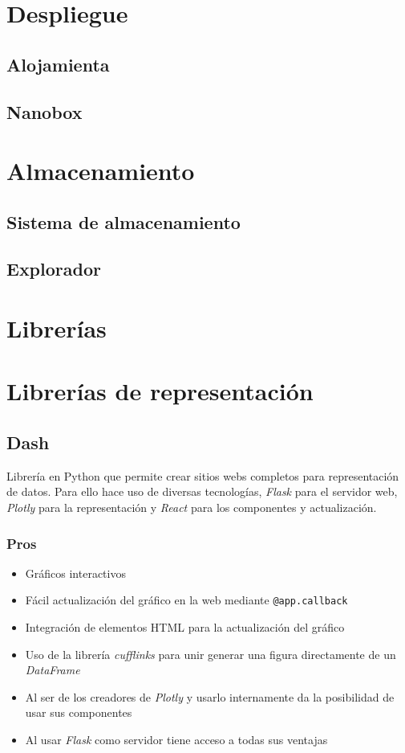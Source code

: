 \section{Despliegue}

\subsection{Alojamienta}

\subsection{Nanobox}

\section{Almacenamiento}

\subsection{Sistema de almacenamiento}

\subsection{Explorador}

\section{Librerías}

\section{Librerías de representación}

\subsection{Dash}
Librería en Python que permite crear sitios webs completos para representación
de datos. Para ello hace uso de diversas tecnologías, \textit{Flask} para el
servidor web, \textit{Plotly} para la representación y \textit{React} para los
componentes y actualización.
\subsubsection{Pros}
\begin{itemize}
	\item Gráficos interactivos
	\item Fácil actualización del gráfico en la web mediante \verb|@app.callback|
	\item Integración de elementos HTML para la actualización del gráfico
	\item Uso de la librería \textit{cufflinks} para unir generar una figura
	directamente de un \textit{DataFrame}
	\item Al ser de los creadores de \textit{Plotly} y usarlo internamente da la
	posibilidad de usar sus componentes
	\item Al usar \textit{Flask} como servidor tiene acceso a todas sus ventajas
\end{itemize}
